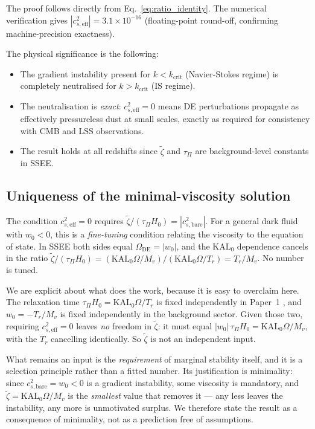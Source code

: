 \documentclass[12pt,a4paper]{article}
\newcommand{\KALz}{\mathrm{KAL}_0}
\newcommand{\wz}{w_0}
\newcommand{\OmDE}{\Omega_{\mathrm{DE}}}
\newcommand{\tauPi}{\tau_\Pi}
\newcommand{\ztilde}{\tilde{\zeta}}
\begin{document}
\vspace{6pt}
The proof follows directly from Eq.~\eqref{eq:ratio_identity}.
The numerical verification gives $|c^2_{s,\mathrm{eff}}| = 3.1\times 10^{-16}$
(floating-point round-off, confirming machine-precision exactness).

The physical significance is the following:
\begin{itemize}
  \item The gradient instability present for $k < k_\mathrm{crit}$
    (Navier-Stokes regime) is completely neutralised for $k > k_\mathrm{crit}$
    (IS regime).
  \item The neutralisation is \emph{exact}: $c^2_{s,\mathrm{eff}} = 0$ means
    DE perturbations propagate as effectively pressureless dust at small scales,
    exactly as required for consistency with CMB and LSS observations.
  \item The result holds at all redshifts since $\ztilde$ and $\tauPi$ are
    background-level constants in SSEE.
\end{itemize}

\subsection{Uniqueness of the minimal-viscosity solution}
\label{subsec:uniqueness}

The condition $c^2_{s,\mathrm{eff}} = 0$ requires $\ztilde/(\tauPi H_0) = |c^2_{s,\mathrm{bare}}|$.
For a general dark fluid with $w_0 < 0$, this is a \emph{fine-tuning} condition
relating the viscosity to the equation of state.
In SSEE both sides equal $\OmDE = |\wz|$, and the $\KALz$ dependence cancels
in the ratio $\ztilde/(\tauPi H_0) = (\KALz\Omega/M_v)/(\KALz\Omega/T_r) = T_r/M_v$.
No number is tuned.

We are explicit about what does the work, because it is easy to overclaim here.
The relaxation time $\tauPi H_0 = \KALz\Omega/T_r$ is fixed independently in
Paper~1 \citep{SSEE_Paper1}, and $\wz = -T_r/M_v$ is fixed independently in the
background sector. Given those two, requiring $c^2_{s,\mathrm{eff}}=0$ leaves
\emph{no} freedom in $\ztilde$: it must equal $|\wz|\,\tauPi H_0
= \KALz\Omega/M_v$, with the $T_r$ cancelling identically. So $\ztilde$ is not
an independent input.

What remains an input is the \emph{requirement} of marginal stability itself,
and it is a selection principle rather than a fitted number. Its justification
is minimality: since $c^2_{s,\mathrm{bare}} = \wz < 0$ is a gradient
instability, some viscosity is mandatory, and $\ztilde = \KALz\Omega/M_v$ is
the \emph{smallest} value that removes it --- any less leaves the instability,
any more is unmotivated surplus. We therefore state the result as a consequence
of minimality, not as a prediction free of assumptions.
\end{document}
